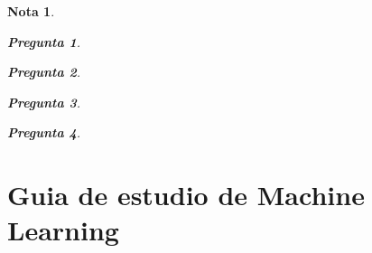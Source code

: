 \documentclass[12pt]{article}
\newtheorem{Note}{Nota}%
\newtheorem{Quest}{Pregunta}[section]
\begin{document}
\begin{Note}
\begin{Quest}
\end{Quest}


\begin{Quest}


\end{Quest}


\begin{Quest}


\end{Quest}


\begin{Quest}


\end{Quest}

\end{Note}



\newpage


\section{Guia de estudio de Machine Learning}
\end{document}
